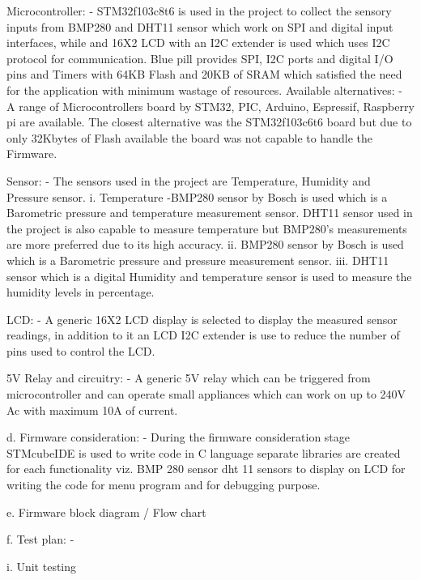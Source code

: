 \begin{DoxyEnumerate}
\item Microcontroller\+: -\/ STM32f103c8t6 is used in the project to collect the sensory inputs from BMP280 and DHT11 sensor which work on SPI and digital input interfaces, while and 16X2 LCD with an I2C extender is used which uses I2C protocol for communication. Blue pill provides SPI, I2C ports and digital I/O pins and Timers with 64KB Flash and 20KB of SRAM which satisfied the need for the application with minimum wastage of resources. Available alternatives\+: -\/ A range of Microcontrollers board by STM32, PIC, Arduino, Espressif, Raspberry pi are available. The closest alternative was the STM32f103c6t6 board but due to only 32Kbytes of Flash available the board was not capable to handle the Firmware.
\item Sensor\+: -\/ The sensors used in the project are Temperature, Humidity and Pressure sensor. i. Temperature -\/BMP280 sensor by Bosch is used which is a Barometric pressure and temperature measurement sensor. DHT11 sensor used in the project is also capable to measure temperature but BMP280’s measurements are more preferred due to its high accuracy. ii. BMP280 sensor by Bosch is used which is a Barometric pressure and pressure measurement sensor. iii. DHT11 sensor which is a digital Humidity and temperature sensor is used to measure the humidity levels in percentage.
\item LCD\+: -\/ A generic 16X2 LCD display is selected to display the measured sensor readings, in addition to it an LCD I2C extender is use to reduce the number of pins used to control the LCD.
\item 5V Relay and circuitry\+: -\/ A generic 5V relay which can be triggered from microcontroller and can operate small appliances which can work on up to 240V Ac with maximum 10A of current.
\end{DoxyEnumerate}

d. Firmware consideration\+: -\/ During the firmware consideration stage STMcube\+IDE is used to write code in C language separate libraries are created for each functionality viz. BMP 280 sensor dht 11 sensors to display on LCD for writing the code for menu program and for debugging purpose.

\begin{DoxyVerb}    e.  Firmware block diagram / Flow chart 
\end{DoxyVerb}
  \begin{DoxyVerb}    f.  Test plan: -
\end{DoxyVerb}
 i. Unit testing


